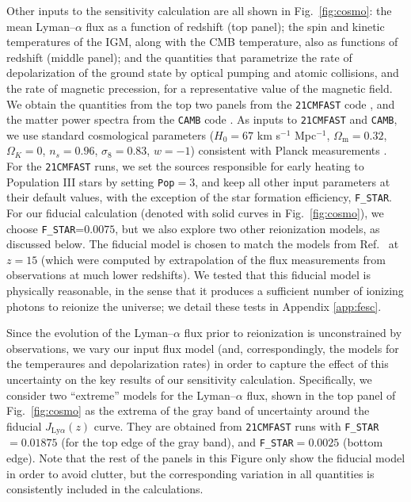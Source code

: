Other inputs to the sensitivity calculation are all shown in Fig.~\ref{fig:cosmo}: the mean Lyman--$\alpha$ flux as a function of redshift (top panel); the spin and kinetic temperatures of the IGM, along with the CMB temperature, also as functions of redshift (middle panel); and the quantities that parametrize the rate of depolarization of the ground state by optical pumping and atomic collisions, and the rate of magnetic precession, for a representative value of the magnetic field. We obtain the quantities from the top two panels from the \texttt{21CMFAST} code \cite{2011MNRAS.411..955M}, and the matter power spectra from the \texttt{CAMB} code \cite{2000ApJ...538..473L}. As inputs to \texttt{21CMFAST} and \texttt{CAMB}, we use standard cosmological parameters ($H_0=67$ km s$^{-1}$ Mpc$^{-1}$, $\Omega_\text{m}=0.32$, $\Omega_K=0$, $n_s=0.96$, $\sigma_8=0.83$, $w=-1$) consistent with Planck measurements \cite{2015arXiv150201589P}. For the \texttt{21CMFAST} runs, we set the sources responsible for early heating to Population III stars by setting \verb|Pop|$=3$, and keep all other input parameters at their default values, with the exception of the star formation efficiency, \verb|F_STAR|. For our fiducial calculation (denoted with solid curves in Fig.~\ref{fig:cosmo}), we choose \verb|F_STAR|=$0.0075$, but we also explore two other reionization models, as discussed below. The fiducial model is chosen to match the models from Ref.~\cite{2012ApJ...746..125H} at $z=15$ (which were computed by extrapolation of the flux measurements from observations at much lower redshifts). We tested that this fiducial model is physically reasonable, in the sense that it produces a sufficient number of ionizing photons to reionize the universe; we detail these tests in Appendix \ref{app:fesc}. 

Since the evolution of the Lyman--$\alpha$ flux prior to reionization is unconstrained by observations, we vary our input flux model (and, correspondingly, the models for the temperaures and depolarization rates) in order to capture the effect of this uncertainty on the key results of our sensitivity calculation. Specifically, we consider two ``extreme'' models for the Lyman--$\alpha$ flux, shown in the top panel of Fig.~\ref{fig:cosmo} as the extrema of the gray band of uncertainty around the fiducial $J_{\text{Ly}\alpha}(z)$ curve. They are obtained from \texttt{21CMFAST} runs with \verb|F_STAR|$=0.01875$  (for the top edge of the gray band), and \verb|F_STAR|$=0.0025$ (bottom edge).  Note that the rest of the panels in this Figure only show the fiducial model in order to avoid clutter, but the corresponding variation in all quantities is consistently included in the calculations. 

